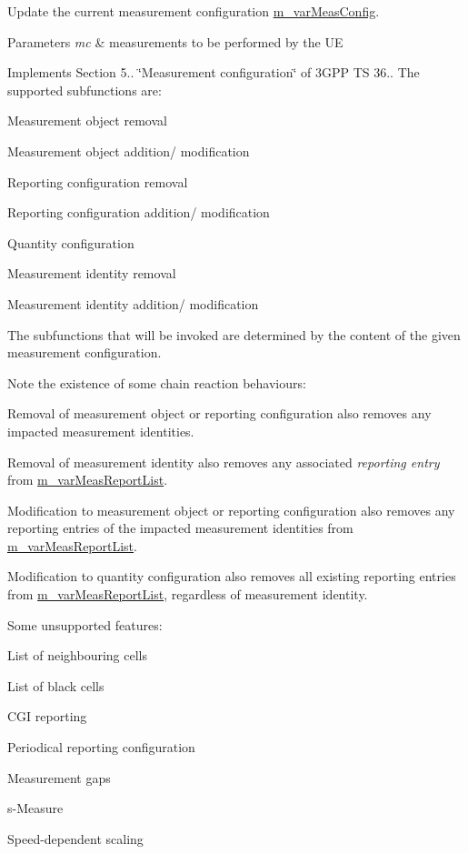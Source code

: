Update the current measurement configuration \hyperlink{classns3_1_1LteUeRrc_a27a7773eedfdab964d2514d9eeb1c562}{m\+\_\+var\+Meas\+Config}. 


\begin{DoxyParams}{Parameters}
{\em mc} & measurements to be performed by the UE\\
\hline
\end{DoxyParams}
Implements Section 5.. \char`\"{}\+Measurement configuration\char`\"{} of 3\+G\+PP TS 36.. The supported subfunctions are\+:
\begin{DoxyItemize}
\item Measurement object removal
\item Measurement object addition/ modification
\item Reporting configuration removal
\item Reporting configuration addition/ modification
\item Quantity configuration
\item Measurement identity removal
\item Measurement identity addition/ modification
\end{DoxyItemize}

The subfunctions that will be invoked are determined by the content of the given measurement configuration.

Note the existence of some chain reaction behaviours\+:
\begin{DoxyItemize}
\item Removal of measurement object or reporting configuration also removes any impacted measurement identities.
\item Removal of measurement identity also removes any associated {\itshape reporting entry} from \hyperlink{classns3_1_1LteUeRrc_a82da3c138c967761910c02b83724a0e4}{m\+\_\+var\+Meas\+Report\+List}.
\item Modification to measurement object or reporting configuration also removes any reporting entries of the impacted measurement identities from \hyperlink{classns3_1_1LteUeRrc_a82da3c138c967761910c02b83724a0e4}{m\+\_\+var\+Meas\+Report\+List}.
\item Modification to quantity configuration also removes all existing reporting entries from \hyperlink{classns3_1_1LteUeRrc_a82da3c138c967761910c02b83724a0e4}{m\+\_\+var\+Meas\+Report\+List}, regardless of measurement identity.
\end{DoxyItemize}

Some unsupported features\+:
\begin{DoxyItemize}
\item List of neighbouring cells
\item List of black cells
\item C\+GI reporting
\item Periodical reporting configuration
\item Measurement gaps
\item s-\/\+Measure
\item Speed-\/dependent scaling
\end{DoxyItemize}


